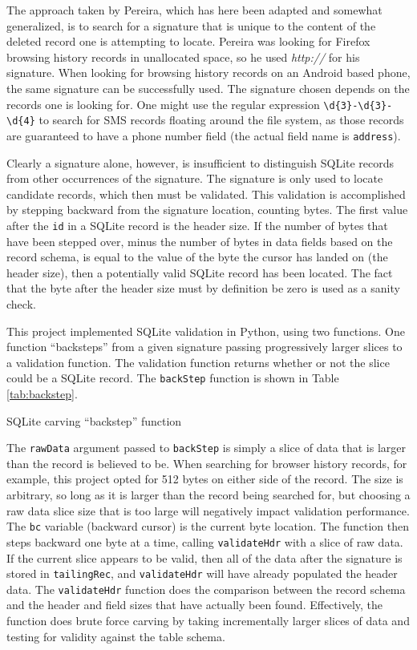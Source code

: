 The approach taken by Pereira, which has here been adapted and somewhat generalized, is to search for a signature that is unique to
the content of the deleted record one is attempting to locate.  Pereira was looking for Firefox browsing history records in
unallocated space, so he used \emph{http://} for his signature.  When looking for browsing history records on an Android based
phone, the same signature can be successfully used.  The signature chosen depends on the records one is looking for.  One might use
the regular expression \verb|\d{3}-\d{3}-\d{4}| to search for SMS records floating around the file system, as those records are guaranteed
to have a phone number field (the actual field name is \texttt{address}). 

Clearly a signature alone, however, is insufficient to distinguish SQLite records from other occurrences of the signature.  The
signature is only used to locate candidate records, which then must be validated.  This validation is accomplished by stepping
backward from the signature location, counting bytes.  The first value after the \texttt{id} in a SQLite record is the header size.
If the number of bytes that have been stepped over, minus the number of bytes in data fields based on the record schema, is equal to
the value of the byte the cursor has landed on (the header size), then a potentially valid SQLite record has been located.  The fact
that the byte after the header size must by definition be zero is used as a sanity check.

This project implemented SQLite validation in Python, using two functions.  One function ``backsteps'' from a given signature
passing progressively larger slices to a validation function.  The validation function returns whether or not the slice could be a
SQLite record.  The \texttt{backStep} function is shown in Table \ref{tab:backstep}. 

\begin{table}[htb]

\caption{SQLite carving ``backstep'' function}
\label{tab:backstep}
\end{table}

The \texttt{rawData} argument passed to \texttt{backStep} is simply a slice of data that is larger than the record is believed to
be.  When searching for browser history records, for example, this project opted for 512 bytes on either side of the record.  The
size is arbitrary, so long as it is larger than the record being searched for, but choosing a raw data slice size that is too large
will negatively impact validation performance.  The \texttt{bc} variable (backward cursor) is the current byte location.  The
function then steps backward one byte at a time, calling \texttt{validateHdr} with a slice of raw data.  If the current
slice appears to be valid, then all of the data after the signature is stored in \texttt{tailingRec}, and \texttt{validateHdr} will
have already populated the header data.  The \texttt{validateHdr} function does the comparison between the record schema and
the header and field sizes that have actually been found.  Effectively, the function does brute force carving by taking
incrementally larger slices of data and testing for validity against the table schema.


